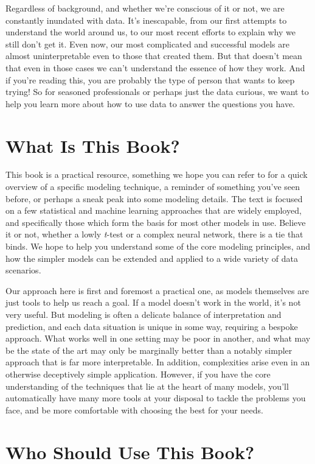 \documentclass[
  letterpaper,
]{krantz}
\begin{document}
Regardless of background, and whether we're conscious of it or not, we
are constantly inundated with data. It's inescapable, from our first
attempts to understand the world around us, to our most recent efforts
to explain why we still don't get it. Even now, our most complicated and
successful models are almost uninterpretable even to those that created
them. But that doesn't mean that even in those cases we can't understand
the essence of how they work. And if you're reading this, you are
probably the type of person that wants to keep trying! So for seasoned
professionals or perhaps just the data curious, we want to help you
learn more about how to use data to answer the questions you have.

\section{What Is This Book?}\label{what-is-this-book}

This book is a practical resource, something we hope you can refer to
for a quick overview of a specific modeling technique, a reminder of
something you've seen before, or perhaps a sneak peak into some modeling
details. The text is focused on a few statistical and machine learning
approaches that are widely employed, and specifically those which form
the basis for most other models in use. Believe it or not, whether a
lowly \emph{t}-test or a complex neural network, there is a tie that
binds. We hope to help you understand some of the core modeling
principles, and how the simpler models can be extended and applied to a
wide variety of data scenarios.

Our approach here is first and foremost a practical one, as models
themselves are just tools to help us reach a goal. If a model doesn't
work in the world, it's not very useful. But modeling is often a
delicate balance of interpretation and prediction, and each data
situation is unique in some way, requiring a bespoke approach. What
works well in one setting may be poor in another, and what may be the
state of the art may only be marginally better than a notably simpler
approach that is far more interpretable. In addition, complexities arise
even in an otherwise deceptively simple application. However, if you
have the core understanding of the techniques that lie at the heart of
many models, you'll automatically have many more tools at your disposal
to tackle the problems you face, and be more comfortable with choosing
the best for your needs.

\section{Who Should Use This Book?}\label{who-should-use-this-book}
\end{document}
